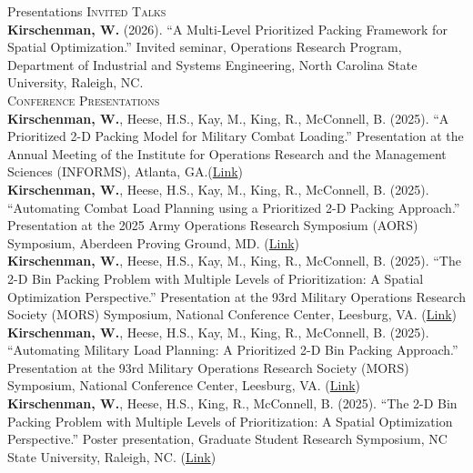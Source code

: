 \documentclass[
	11pt,
]{resume}
\begin{document}
\begin{rSection}{Presentations}
    \textsc{Invited Talks} \medskip \\
    \textbf{Kirschenman, W.} (2026). ``A Multi-Level Prioritized Packing Framework for Spatial Optimization.'' Invited seminar, Operations Research Program, Department of Industrial and Systems Engineering, North Carolina State University, Raleigh, NC. \medskip \\

    \textsc{Conference Presentations} \medskip \\
    \textbf{Kirschenman, W.}, Heese, H.S., Kay, M., King, R., McConnell, B. (2025). ``A Prioritized 2-D Packing Model for Military Combat Loading.'' Presentation at the Annual Meeting of the Institute for Operations Research and the Management Sciences (INFORMS), Atlanta, GA.(\href{https://willk30.github.io/files/Kirschenman_INFORMS_2025.pdf}{Link}) \medskip \\
    \textbf{Kirschenman, W.}, Heese, H.S., Kay, M., King, R., McConnell, B. (2025). ``Automating Combat Load Planning using a Prioritized 2-D Packing Approach.'' Presentation at the 2025 Army Operations Research Symposium (AORS) Symposium, Aberdeen Proving Ground, MD. (\href{https://willk30.github.io/files/Kirschenman_AORS_WG4_Slides_v2.pdf}{Link}) \medskip \\
    \textbf{Kirschenman, W.}, Heese, H.S., Kay, M., King, R., McConnell, B. (2025). ``The 2-D Bin Packing Problem with Multiple Levels of Prioritization: A Spatial Optimization Perspective.'' Presentation at the 93rd Military Operations Research Society (MORS) Symposium, National Conference Center, Leesburg, VA. (\href{https://willk30.github.io/files/WG29_MORSS_Kirschenman_Slides.pdf}{Link}) \medskip \\
    \textbf{Kirschenman, W.}, Heese, H.S., Kay, M., King, R., McConnell, B. (2025). ``Automating Military Load Planning: A Prioritized 2-D Bin Packing Approach.'' Presentation at the 93rd Military Operations Research Society (MORS) Symposium, National Conference Center, Leesburg, VA. (\href{https://willk30.github.io/files/WG16_MORSS_Kirschenman_Slides.pdf}{Link}) \medskip \\
    \textbf{Kirschenman, W.}, Heese, H.S., King, R., McConnell, B. (2025). ``The 2-D Bin Packing Problem with Multiple Levels of Prioritization: A Spatial Optimization Perspective.'' Poster presentation, Graduate Student Research Symposium, NC State University, Raleigh, NC. (\href{https://willk30.github.io/documents/Kirschenman_GSRS_Poster.pdf}{Link}) \medskip \\

\end{rSection}
\end{document}
